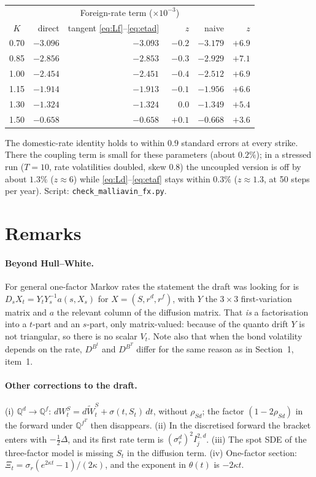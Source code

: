 \documentclass[11pt,a4paper]{article}
\theoremstyle{plain}
\theoremstyle{remark}
\newcommand{\Q}{\mathbb{Q}}
\newcommand{\sgd}{\sigma^d_r}
\begin{document}
\begin{center}
\begin{tabular}{c|rrr|rr}
\toprule
\multicolumn{6}{c}{Foreign-rate term ($\times10^{-3}$)}\\
$K$ & direct & tangent \eqref{eq:Lf}--\eqref{eq:etad} & $z$ & naive & $z$\\
\midrule
0.70 & $-3.096$ & $-3.093$ & $-0.2$ & $-3.179$ & $+6.9$\\
0.85 & $-2.856$ & $-2.853$ & $-0.3$ & $-2.929$ & $+7.1$\\
1.00 & $-2.454$ & $-2.451$ & $-0.4$ & $-2.512$ & $+6.9$\\
1.15 & $-1.914$ & $-1.913$ & $-0.1$ & $-1.956$ & $+6.6$\\
1.30 & $-1.324$ & $-1.324$ & $\phantom{+}0.0$ & $-1.349$ & $+5.4$\\
1.50 & $-0.658$ & $-0.658$ & $+0.1$ & $-0.668$ & $+3.6$\\
\bottomrule
\end{tabular}
\end{center}

\noindent The domestic-rate identity holds to within $0.9$ standard errors at
every strike. There the coupling term is small for these parameters (about
$0.2\%$); in a stressed run ($T=10$, rate volatilities doubled, skew $0.8$) the
uncoupled version is off by about $1.3\%$ ($z\approx6$) while
\eqref{eq:Ld}--\eqref{eq:etaf} stays within $0.3\%$ ($z\approx1.3$, at 50
steps per year). Script:
\texttt{check\_malliavin\_fx.py}.

\section{Remarks}

\paragraph{Beyond Hull--White.} For general one-factor Markov rates the
statement the draft was looking for is
$D_sX_t=Y_tY_s^{-1}a(s,X_s)$ for $X=(S,r^d,r^f)$, with $Y$ the $3\times3$
first-variation matrix and $a$ the relevant column of the diffusion matrix.
That \emph{is} a factorisation into a $t$-part and an $s$-part, only
matrix-valued: because of the quanto drift $Y$ is not triangular, so there is
no scalar $V_t$. Note also that when the bond volatility depends on the rate,
$D^{B^t}$ and $D^{B^T}$ differ for the same reason as in Section~1, item~1.

\paragraph{Other corrections to the draft.}
(i) $\Q^d\to\Q^f$: $dW^S_t=d\widetilde W^S_t+\sigma(t,S_t)\,dt$, without
$\rho_{Sd}$; the factor $(1-2\rho_{Sd})$ in the forward under $\Q^{f^T}$ then
disappears.
(ii) In the discretised forward the bracket enters with $-\tfrac12\Delta$, and
its first rate term is $(\sgd)^2I^{2,d}_j$.
(iii) The spot SDE of the three-factor model is missing $S_t$ in the diffusion
term.
(iv) One-factor section: $\Xi_t=\sigma_r(e^{2\kappa t}-1)/(2\kappa)$, and the
exponent in $\theta(t)$ is $-2\kappa t$.
\end{document}
